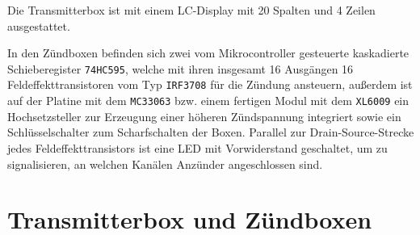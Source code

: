 \documentclass[pdftex, parskip, numbers=noenddot, toc=listof]{scrbook}
\begin{document}
			Die Transmitterbox ist mit einem LC-Display mit 20 Spalten und 4 Zeilen ausgestattet.

			In den Zündboxen befinden sich zwei vom Mikrocontroller gesteuerte kaskadierte Schieberegister \texttt{74HC595}, welche mit ihren insgesamt 16 Ausgängen 16 Feldeffekttransistoren vom Typ \texttt{IRF3708} für die Zündung ansteuern, außerdem ist auf der Platine mit dem \texttt{MC33063} bzw. einem fertigen Modul mit dem \texttt{XL6009} ein Hochsetzsteller zur Erzeugung einer höheren Zündspannung integriert sowie ein Schlüsselschalter zum Scharfschalten der Boxen. Parallel zur Drain-Source-Strecke jedes Feldeffekttransistors ist eine LED mit Vorwiderstand geschaltet, um zu signalisieren, an welchen Kanälen Anzünder angeschlossen sind.



		\section{Transmitterbox und Zündboxen}
\end{document}
